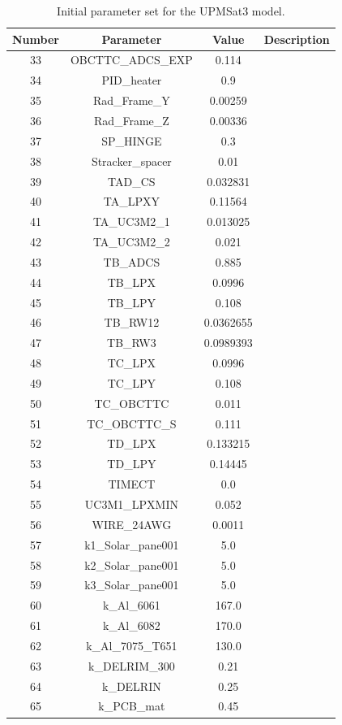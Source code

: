 \begin{table}[H]
    \centering
    \caption{Initial parameter set for the UPMSat3 model.}
    \label{tab:initialparamsUPMSat3}
\begin{tabular}{cccc}
    \hline
    Number & Parameter & Value & Description \\
    \hline   
    33 & OBCTTC\_ADCS\_EXP & 0.114 &  \\
    34 & PID\_heater & 0.9 &  \\
    35 & Rad\_Frame\_Y & 0.00259 &  \\
    36 & Rad\_Frame\_Z & 0.00336 &  \\
    37 & SP\_HINGE & 0.3 &  \\
    38 & Stracker\_spacer & 0.01 &  \\
    39 & TAD\_CS & 0.032831 &  \\
    40 & TA\_LPXY & 0.11564 &  \\
    41 & TA\_UC3M2\_1 & 0.013025 &  \\
    42 & TA\_UC3M2\_2 & 0.021 &  \\
    43 & TB\_ADCS & 0.885 &  \\
    44 & TB\_LPX & 0.0996 &  \\
    45 & TB\_LPY & 0.108 &  \\
    46 & TB\_RW12 & 0.0362655 &  \\
    47 & TB\_RW3 & 0.0989393 &  \\
    48 & TC\_LPX & 0.0996 &  \\
    49 & TC\_LPY & 0.108 &  \\
    50 & TC\_OBCTTC & 0.011 &  \\
    51 & TC\_OBCTTC\_S & 0.111 &  \\
    52 & TD\_LPX & 0.133215 &  \\
    53 & TD\_LPY & 0.14445 &  \\
    54 & TIMECT & 0.0 &  \\
    55 & UC3M1\_LPXMIN & 0.052 &  \\
    56 & WIRE\_24AWG & 0.0011 &  \\
    57 & k1\_Solar\_pane001 & 5.0 &  \\
    58 & k2\_Solar\_pane001 & 5.0 &  \\
    59 & k3\_Solar\_pane001 & 5.0 &  \\
    60 & k\_Al\_6061 & 167.0 &  \\
    61 & k\_Al\_6082 & 170.0 &  \\
    62 & k\_Al\_7075\_T651 & 130.0 &  \\
    63 & k\_DELRIM\_300 & 0.21 &  \\
    64 & k\_DELRIN & 0.25 &  \\
    65 & k\_PCB\_mat & 0.45 &  \\
    \hline
    \end{tabular}
\end{table}

